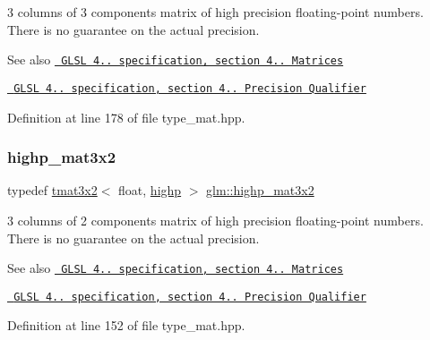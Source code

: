 3 columns of 3 components matrix of high precision floating-\/point numbers. There is no guarantee on the actual precision.

\begin{DoxySeeAlso}{See also}
\href{http://www.opengl.org/registry/doc/GLSLangSpec.4.20.8.pdf}{\texttt{ G\+L\+SL 4.. specification, section 4.. Matrices}} 

\href{http://www.opengl.org/registry/doc/GLSLangSpec.4.20.8.pdf}{\texttt{ G\+L\+SL 4.. specification, section 4.. Precision Qualifier}} 
\end{DoxySeeAlso}


Definition at line 178 of file type\+\_\+mat.\+hpp.

\mbox{\label{group__core__precision_ga5df0f5c4120d0fd47825506c86b7814c}} 
\subsubsection{\texorpdfstring{highp\_mat3x2}{highp\_mat3x2}}
{\footnotesize\ttfamily typedef \mbox{\hyperlink{structglm_1_1tmat3x2}{tmat3x2}}$<$ float, \mbox{\hyperlink{namespaceglm_a0f04f086094c747d227af4425893f545ac6f7eab42eacbb10d59a58e95e362074}{highp}} $>$ \mbox{\hyperlink{group__core__precision_ga5df0f5c4120d0fd47825506c86b7814c}{glm\+::highp\+\_\+mat3x2}}}

3 columns of 2 components matrix of high precision floating-\/point numbers. There is no guarantee on the actual precision.

\begin{DoxySeeAlso}{See also}
\href{http://www.opengl.org/registry/doc/GLSLangSpec.4.20.8.pdf}{\texttt{ G\+L\+SL 4.. specification, section 4.. Matrices}} 

\href{http://www.opengl.org/registry/doc/GLSLangSpec.4.20.8.pdf}{\texttt{ G\+L\+SL 4.. specification, section 4.. Precision Qualifier}} 
\end{DoxySeeAlso}


Definition at line 152 of file type\+\_\+mat.\+hpp.

\mbox{\label{group__core__precision_gac4db2c4ff089b960ddd5682abaa9e5d4}} 
